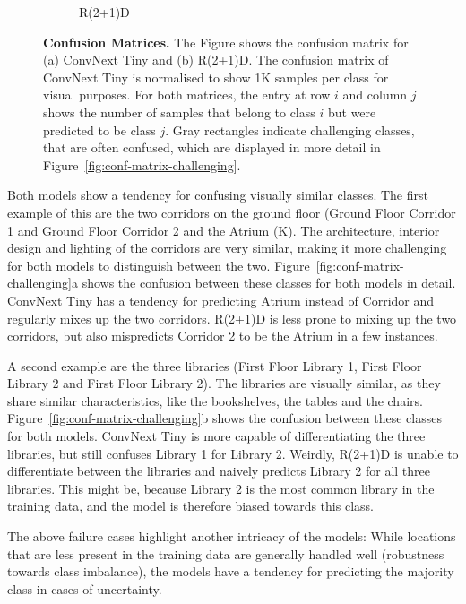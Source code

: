 \documentclass[a4paper]{article}
\begin{document}
\begin{figure}
\begin{subfigure}[b]{0.49\textwidth}
    \caption{R(2+1)D}
  \end{subfigure}
  \caption{
    \textbf{Confusion Matrices.} The Figure shows the confusion matrix for (a)
    ConvNext Tiny and (b) R(2+1)D. The confusion matrix of ConvNext Tiny is
    normalised to show 1K samples per class for visual purposes. For both
    matrices, the entry at row $i$ and column $j$ shows the number of samples
    that belong to class $i$ but were predicted to be class $j$. Gray
    rectangles indicate challenging classes, that are often confused, which are
    displayed in more detail in Figure~\ref{fig:conf-matrix-challenging}.
  }
  \label{fig:conf-matrix}
\end{figure}

Both models show a tendency for confusing visually similar classes. 
The first example of this are the two corridors on the ground floor (Ground Floor
Corridor 1 and Ground Floor Corridor 2 and the Atrium (K). The architecture,
interior design and lighting of the corridors are very similar, making it more
challenging for both models to distinguish between the two.
Figure~\ref{fig:conf-matrix-challenging}a shows the confusion between these
classes for both models in detail. ConvNext Tiny has a tendency for predicting
Atrium instead of Corridor and regularly mixes up the two corridors. R(2+1)D
is less prone to mixing up the two corridors, but also mispredicts Corridor 2 to
be the Atrium in a few instances.

A second example are the three libraries (First Floor Library 1, First Floor
Library 2 and First Floor Library 2). The libraries are visually similar, as
they share similar characteristics, like the bookshelves, the tables and the
chairs. Figure~\ref{fig:conf-matrix-challenging}b shows the confusion between
these classes for both models. ConvNext Tiny is more capable of differentiating
the three libraries, but still confuses Library 1 for Library 2. Weirdly, R(2+1)D 
is unable to differentiate between the libraries and naively predicts Library 2
for all three libraries. This might be, because Library 2 is the most common 
library in the training data, and the model is therefore biased towards this
class.

The above failure cases highlight another intricacy of the models: While
locations that are less present in the training data are generally handled well
(robustness towards class imbalance), the models have a tendency for predicting
the majority class in cases of uncertainty.
\end{document}
